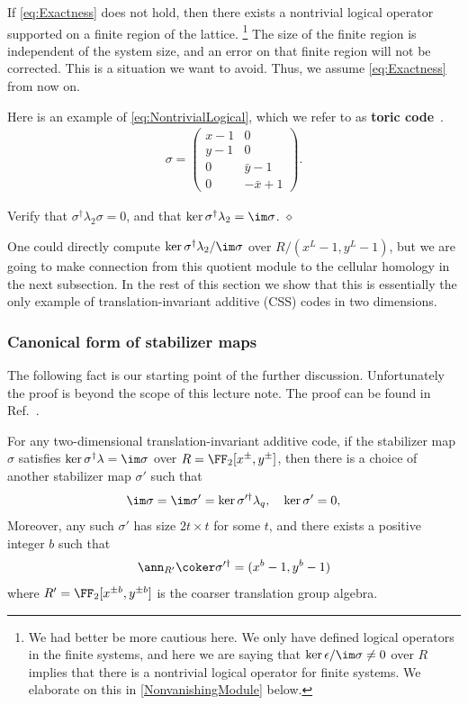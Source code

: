 If \eqref{eq:Exactness} does not hold,
then there exists a nontrivial logical operator
supported on a finite region of the lattice.%
\footnote{
We had better be more cautious here.
We only have defined logical operators in the finite systems,
and here we are saying that $\ker \epsilon / \im \sigma \neq 0$
over $R$ implies that there is a nontrivial logical operator for finite systems.
We elaborate on this in \ref{NonvanishingModule} below.
}
The size of the finite region is independent of the system size,
and an error on that finite region will not be corrected.
This is a situation we want to avoid.
Thus, we assume \eqref{eq:Exactness} from now on.

Here is an example of \eqref{eq:NontrivialLogical},
which we refer to as {\bf toric code}~\cite{Kitaev2003Fault-tolerant}.
\begin{align}
\sigma =
\begin{pmatrix}
x-1 & 0 \\
y-1 & 0 \\
0 & \bar y-1 \\
0 & -\bar x+1
\end{pmatrix}.
\label{eq:ToricCode}
\end{align}
\begin{exc}
Verify that $\sigma^\dagger \lambda_2 \sigma = 0$,
and that $\ker \sigma^\dagger \lambda_2 = \im \sigma$.
\hfill $\diamond$ \end{exc}
One could directly compute $\ker \sigma^\dagger \lambda_2 / \im \sigma$
over $R/(x^L-1, y^L-1)$,
but we are going to make connection from this quotient module 
to the cellular homology in the next subsection.
In the rest of this section we show that 
this is essentially the only example of translation-invariant additive (CSS) codes
in two dimensions.

\subsubsection{Canonical form of stabilizer maps}

The following fact is our starting point of the further discussion.
Unfortunately the proof is beyond the scope of this lecture note.
The proof can be found in Ref.~\cite{Haah2012PauliModule}.
\begin{prop}
For any two-dimensional translation-invariant additive code,
if the stabilizer map $\sigma$ satisfies
$\ker \sigma^\dagger \lambda = \im \sigma$ over $R = \FF_2[x^\pm, y^\pm]$,
then there is a choice of another stabilizer map $\sigma'$ such that
\begin{align}
 \im \sigma = \im \sigma' = \ker \sigma'^\dagger \lambda_q,
 \quad \ker \sigma' = 0,\label{eq:InjectiveSigma}
\end{align}
Moreover, any such $\sigma'$ has size $2t \times t$ for some $t$,
and there exists a positive integer $b$ such that
\begin{align}
 \ann_{R'} \coker \sigma'^\dagger = (x^b -1, y^b -1) \label{eq:AnnihilatorCondition}
\end{align}
where $R' = \FF_2[x^{\pm b}, y^{\pm b}]$
is the coarser translation group algebra.
\label{Canonical2Dsigma}
\end{prop}

